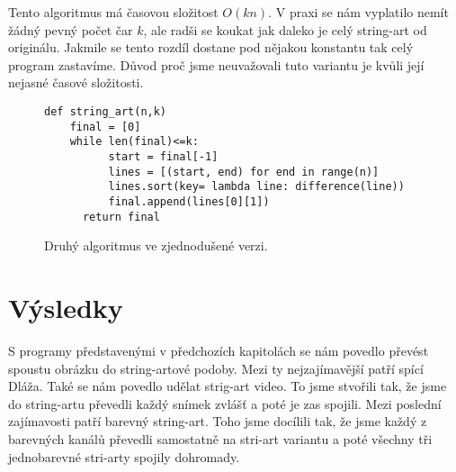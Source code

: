 \documentclass{article}
\begin{document}
Tento algoritmus má časovou složitost $O(kn)$. V praxi se nám vyplatilo nemít
žádný pevný počet čar $k$, ale radši se koukat jak daleko je celý string-art od
originálu. Jakmile se tento rozdíl dostane pod nějakou konstantu tak celý
program zastavíme. Důvod proč jsme neuvažovali tuto variantu je kvůli její
nejasné časové složitosti. 

\begin{figure}
 \label{fig:second}
\begin{mdframed}[style=MyFrame]
\begin{lstlisting}[style=metoo]
def string_art(n,k)
    final = [0]
    while len(final)<=k:
	      start = final[-1]
	      lines = [(start, end) for end in range(n)]
	      lines.sort(key= lambda line: difference(line))
	      final.append(lines[0][1])
	  return final
 \end{lstlisting}
\end{mdframed}

 \caption{Druhý algoritmus ve zjednodušené verzi.}
\end{figure}




\section{Výsledky}
\label{sec:vysledky}
S programy představenými v předchozích kapitolách se nám povedlo převést spoustu
obrázku do string-artové podoby. Mezi ty nejzajímavější patří spící Dláža. Také
se nám povedlo udělat strig-art video. To jsme stvořili tak, že jsme do
string-artu převedli každý snímek zvlášť a poté je zas spojili. Mezi poslední
zajímavosti patří barevný string-art. Toho jsme docílili tak, že jsme každý z
barevných kanálů převedli samostatně na stri-art variantu a poté všechny tři
jednobarevné stri-arty spojily dohromady.

\end{document}
